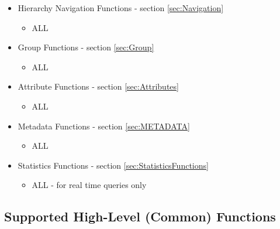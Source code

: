 \begin{itemize}[noitemsep,nolistsep] 
	\item{Hierarchy Navigation Functions - section \ref{sec:Navigation}}
		\begin{itemize}[noitemsep,nolistsep] 
			\item{ALL}
		\end{itemize}
	\item{Group Functions - section \ref{sec:Group}}
		\begin{itemize}[noitemsep,nolistsep] 
			\item{ALL}
		\end{itemize}
	\item{Attribute Functions - section \ref{sec:Attributes}}
		\begin{itemize}[noitemsep,nolistsep] 
			\item{ALL}
		\end{itemize}
	\item{Metadata Functions - section \ref{sec:METADATA}}
		\begin{itemize}[noitemsep,nolistsep] 
			\item{ALL}
		\end{itemize}
	\item{Statistics Functions - section \ref{sec:StatisticsFunctions}}
		\begin{itemize}[noitemsep,nolistsep] 
			\item{ALL - for real time queries only}
		\end{itemize}
\end{itemize}


\subsection{Supported High-Level (Common) Functions}\label{sec:AppOSHighLevel}

